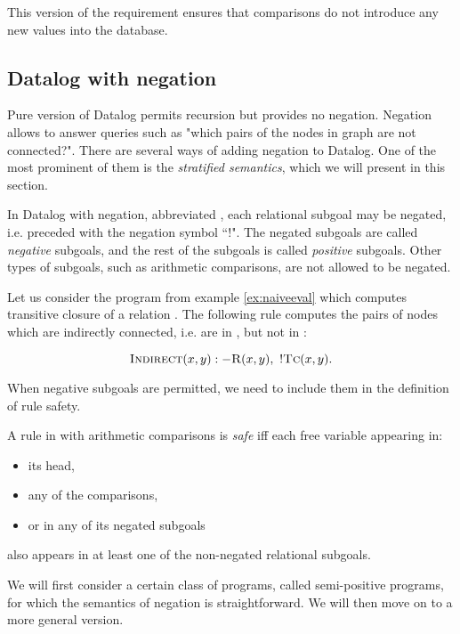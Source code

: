 This version of the requirement ensures that comparisons do not introduce any new values into the database.

\subsection{Datalog with negation}\label{ss:datalogneg}
Pure version of Datalog permits recursion but provides no negation. Negation allows to answer queries such as "which pairs of the nodes in graph are not connected?". There are several ways of adding negation to Datalog. One of the most prominent of them is the \emph{stratified semantics}, which we will present in this section. 

In Datalog with negation, abbreviated \datalogneg, each relational subgoal may be negated, i.e. preceded with the negation symbol ``$!$". The negated subgoals are called \emph{negative} subgoals, and the rest of the subgoals is called \emph{positive} subgoals. Other types of subgoals, such as arithmetic comparisons, are not allowed to be negated.

\begin{exmp}
Let us consider the program from example \ref{ex:naiveeval} which computes transitive closure  of a relation . The following rule computes the pairs of nodes which are indirectly connected, i.e. are in , but not in :

$$\textsc{Indirect}(x, y) :- \textsc{R}(x, y),~!\textsc{Tc}(x, y).$$
\end{exmp}

When negative subgoals are permitted, we need to include them in the definition of rule safety.

\begin{defn}\label{d:datalognegsaferule}
A rule in \datalogneg with arithmetic comparisons is \emph{safe} iff each free variable appearing in:
\begin{itemize}
\item its head,
\item any of the comparisons,
\item or in any of its negated subgoals
\end{itemize}
also appears in at least one of the non-negated relational subgoals.
\end{defn}

We will first consider a certain class of \datalogneg programs, called semi-positive programs, for which the semantics of negation is straightforward. We will then move on to a more general version.

